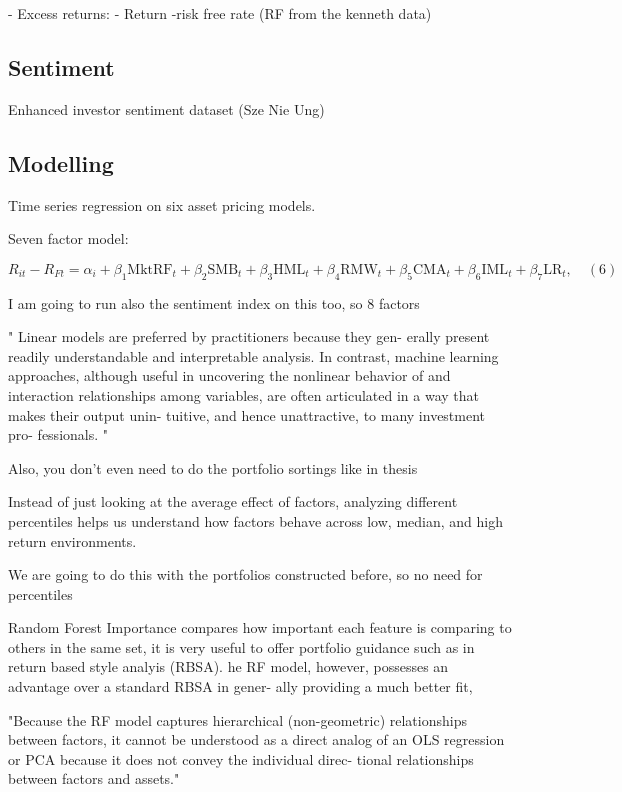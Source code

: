 - Excess returns:
    - Return -risk free rate (RF from the kenneth data)

\subsection{Sentiment}
Enhanced investor sentiment dataset (Sze Nie Ung)


\subsection{Modelling}

Time series regression on six asset pricing models.

Seven factor model:

\[
R_{it} - R_{Ft} = \alpha_i + \beta_1 \text{MktRF}_t + \beta_2 \text{SMB}_t + \beta_3 \text{HML}_t + \beta_4 \text{RMW}_t + \beta_5 \text{CMA}_t + \beta_6 \text{IML}_t + \beta_7 \text{LR}_t, \quad (6)
\]

I am going to run also the sentiment index on this too, so 8 factors

" Linear
models are preferred by practitioners because they gen-
erally present readily understandable and interpretable
analysis. In contrast, machine learning approaches,
although useful in uncovering the nonlinear behavior
of and interaction relationships among variables, are
often articulated in a way that makes their output unin-
tuitive, and hence unattractive, to many investment pro-
fessionals. "

Also, you don't even need to do the portfolio sortings like in thesis

Instead of just looking at the average effect of factors, analyzing different percentiles helps us understand how factors behave across low, median, and high return environments.

We are going to do this with the portfolios constructed before, so no need for percentiles


Random Forest Importance compares how important each feature is comparing to others in the same set, it is very useful to offer portfolio guidance such as in  return based style analyis (RBSA). he RF model, however,
possesses an advantage over a standard RBSA in gener-
ally providing a much better fit,

"Because the RF model captures hierarchical
(non-geometric) relationships between factors, it cannot
be understood as a direct analog of an OLS regression
or PCA because it does not convey the individual direc-
tional relationships between factors and assets."

